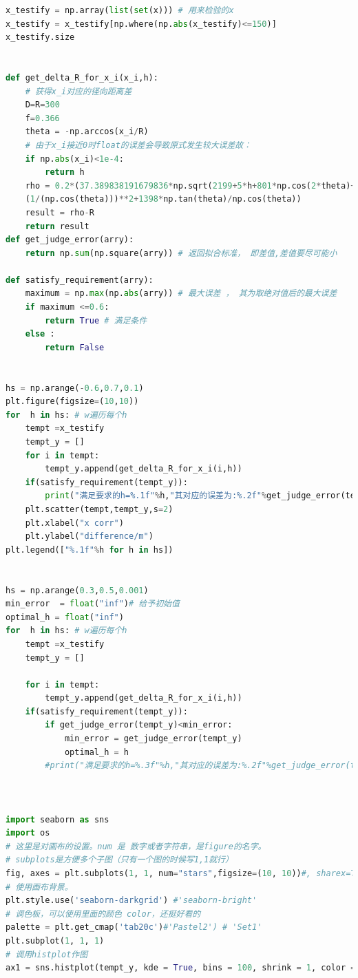\documentclass[withoutpreface,bwprint]{cumcmthesis} %
\begin{document}
\begin{appendices}
\begin{lstlisting}[language=python]
x_testify = np.array(list(set(x))) # 用来检验的x
x_testify = x_testify[np.where(np.abs(x_testify)<=150)]
x_testify.size


def get_delta_R_for_x_i(x_i,h):
    # 获得x_i对应的径向距离差
    D=R=300
    f=0.366
    theta = -np.arccos(x_i/R)
    # 由于x_i接近0时float的误差会导致原式发生较大误差故：
    if np.abs(x_i)<1e-4:
        return h 
    rho = 0.2*(37.389838191679836*np.sqrt(2199+5*h+801*np.cos(2*theta)+5*h*np.cos(2*theta))*
    (1/(np.cos(theta)))**2+1398*np.tan(theta)/np.cos(theta))
    result = rho-R
    return result
def get_judge_error(arry):
    return np.sum(np.square(arry)) # 返回拟合标准， 即差值,差值要尽可能小

def satisfy_requirement(arry):
    maximum = np.max(np.abs(arry)) # 最大误差 ， 其为取绝对值后的最大误差
    if maximum <=0.6:
        return True # 满足条件
    else :
        return False 
    

hs = np.arange(-0.6,0.7,0.1)
plt.figure(figsize=(10,10))
for  h in hs: # w遍历每个h 
    tempt =x_testify
    tempt_y = []
    for i in tempt:
        tempt_y.append(get_delta_R_for_x_i(i,h))
    if(satisfy_requirement(tempt_y)):
        print("满足要求的h=%.1f"%h,"其对应的误差为:%.2f"%get_judge_error(tempt_y))
    plt.scatter(tempt,tempt_y,s=2)
    plt.xlabel("x corr")
    plt.ylabel("difference/m")
plt.legend(["%.1f"%h for h in hs])


hs = np.arange(0.3,0.5,0.001)
min_error  = float("inf")# 给予初始值
optimal_h = float("inf")
for  h in hs: # w遍历每个h 
    tempt =x_testify
    tempt_y = []
    
    for i in tempt:
        tempt_y.append(get_delta_R_for_x_i(i,h))
    if(satisfy_requirement(tempt_y)):
        if get_judge_error(tempt_y)<min_error:
            min_error = get_judge_error(tempt_y)
            optimal_h = h
        #print("满足要求的h=%.3f"%h,"其对应的误差为:%.2f"%get_judge_error(tempt_y))



import seaborn as sns
import os
# 这里是对画布的设置。num 是 数字或者字符串，是figure的名字。
# subplots是方便多个子图（只有一个图的时候写1,1就行）
fig, axes = plt.subplots(1, 1, num="stars",figsize=(10, 10))#, sharex=True)
# 使用画布背景。
plt.style.use('seaborn-darkgrid') #'seaborn-bright'
# 调色板，可以使用里面的颜色 color，还挺好看的
palette = plt.get_cmap('tab20c')#'Pastel2') # 'Set1' 
plt.subplot(1, 1, 1)
# 调用histplot作图
ax1 = sns.histplot(tempt_y, kde = True, bins = 100, shrink = 1, color = palette.colors[0], edgecolor = palette.colors[-1])#"none")#, element="step")# element = "poly") # cumulative = True)


\end{lstlisting}
\end{appendices}
\end{document}
